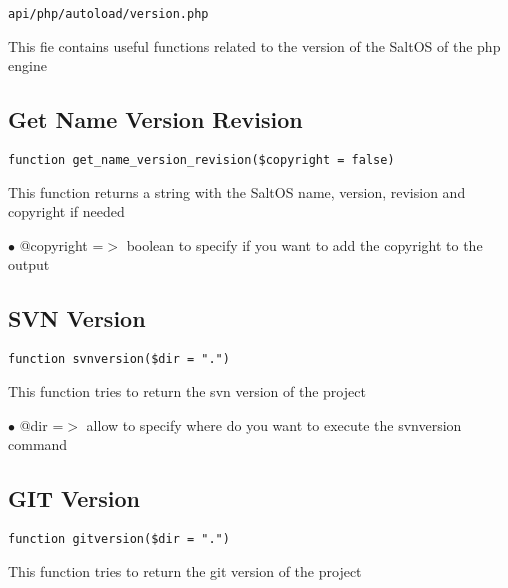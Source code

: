 \documentclass[a4paper]{book}
\begin{document}
\begin{lstlisting}
api/php/autoload/version.php
\end{lstlisting}

This fie contains useful functions related to the version of the SaltOS of the php engine

\hypertarget{toc288}{}
\subsection{Get Name Version Revision}

\begin{lstlisting}
function get_name_version_revision($copyright = false)
\end{lstlisting}

This function returns a string with the SaltOS name, version, revision and
copyright if needed

\begin{compactitem}
\item[\color{myblue}$\bullet$] @copyright =$>$ boolean to specify if you want to add the copyright to the output
\end{compactitem}

\hypertarget{toc289}{}
\subsection{SVN Version}

\begin{lstlisting}
function svnversion($dir = ".")
\end{lstlisting}

This function tries to return the svn version of the project

\begin{compactitem}
\item[\color{myblue}$\bullet$] @dir =$>$ allow to specify where do you want to execute the svnversion command
\end{compactitem}

\hypertarget{toc290}{}
\subsection{GIT Version}

\begin{lstlisting}
function gitversion($dir = ".")
\end{lstlisting}

This function tries to return the git version of the project
\end{document}
